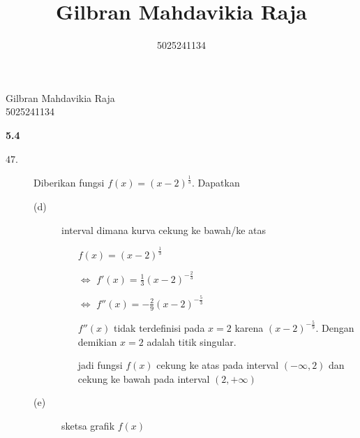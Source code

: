 \documentclass{article}
\title{Gilbran Mahdavikia Raja}
\author{5025241134}
\begin{document}
\begin{flushleft}
    Gilbran Mahdavikia Raja \\
    5025241134 \\
\end{flushleft}
{\Large \textbf{5.4}}
\begin{description}
    \item[$47.$] Diberikan fungsi $f(x) = (x - 2)^{\frac{1}{3}}$. Dapatkan 
    \begin{description}
        \item[(d)] interval dimana kurva cekung ke bawah/ke atas
        \begin{itemize}
            \item[] $f(x) = (x - 2)^{\frac{1}{3}}$
            \item[$\Leftrightarrow$] $f'(x) = \frac{1}{3}(x - 2)^{-\frac{2}{3}}$
            \item[$\Leftrightarrow$] $f''(x) = -\frac{2}{9}(x - 2)^{-\frac{5}{3}}$
            \item[] $f''(x)$ tidak terdefinisi pada $x = 2$ karena $(x - 2)^{-\frac{5}{9}}$. Dengan demikian $x = 2$ adalah titik singular.
            \item[] 
            \item[] jadi fungsi $f(x)$ cekung ke atas pada interval $(-\infty, 2)$ dan cekung ke bawah pada interval $(2, +\infty)$
        \end{itemize}
        \item[(e)] sketsa grafik $f(x)$

\end{description}
\end{description}
\end{document}
